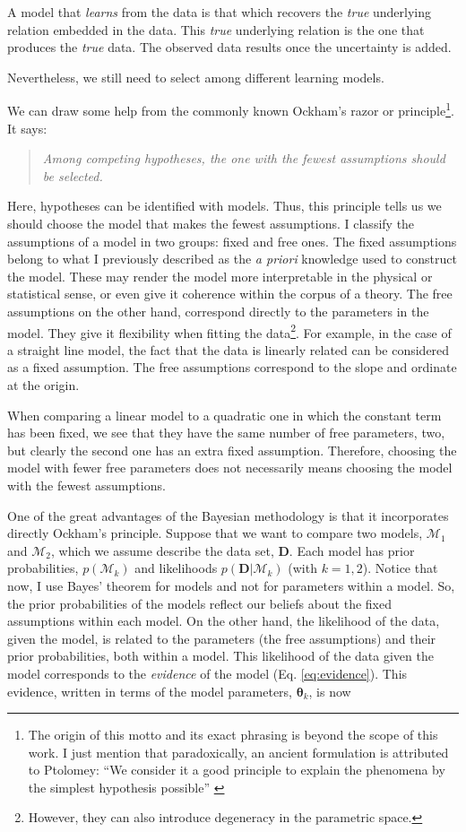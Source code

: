 A model that \emph{learns} from the data is that which recovers the \emph{true} underlying relation embedded in the data. This \emph{true} underlying relation is the one that produces the \emph{true} data. The observed data results once the uncertainty is added. 

Nevertheless, we still need to select among different learning models.  

We can draw some help from the commonly known Ockham's razor or principle\footnote{The origin of this motto and its exact phrasing is beyond the scope of this work. I just mention that paradoxically, an ancient formulation is attributed to Ptolomey: ``We consider it a good principle to explain the phenomena by the simplest hypothesis possible'' \citep{Franklin2002}}. It says:
\begin{quotation}
\textit{Among competing hypotheses, the one with the fewest assumptions should be selected.}
\end{quotation}

Here, hypotheses can be identified with models. Thus, this principle tells us we should choose the model that makes the fewest assumptions. I classify the assumptions of a model in two groups: fixed and free ones. The fixed assumptions belong to what I previously described as the \emph{a priori} knowledge used to construct the model. These may render the model more interpretable in the physical or statistical sense, or even give it coherence within the corpus of a theory. The free assumptions on the other hand, correspond directly to the parameters in the model. They give it flexibility when fitting the data\footnote{However, they can also introduce degeneracy in the parametric space.}. For example, in the case of a straight line model, the fact that the data is linearly related can be considered as a fixed assumption. The free assumptions correspond to the slope and ordinate at the origin. 

When comparing a linear model to a quadratic one in which the constant term has been fixed, we see that they have the same number of free parameters, two, but clearly the second one has an extra fixed assumption. Therefore, choosing the model with fewer free parameters does not necessarily means choosing the model with the fewest assumptions.

One of the great advantages of the Bayesian methodology is that it incorporates directly Ockham's principle. Suppose that we want to compare two models, $\mathcal{M}_1$ and $\mathcal{M}_2$, which we assume describe the data set, $\mathbf{D}$. Each model has prior probabilities, $p(\mathcal{M}_k)$ and likelihoods $p(\mathbf{D}|\mathcal{M}_k)$ (with $k=1,2$). Notice that now, I use Bayes' theorem for models and not for parameters within a model. So, the prior probabilities of the models reflect our beliefs about the fixed assumptions within each model. On the other hand, the likelihood of the data, given the model, is related to the parameters (the free assumptions) and their prior probabilities, both within a model. This likelihood of the data given the model corresponds to the \emph{evidence} of the model (Eq. \ref{eq:evidence}). This evidence, written in terms of the model parameters, $\boldsymbol{\theta}_k$, is now

